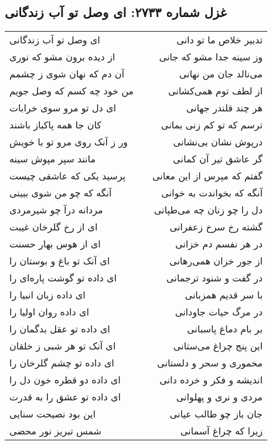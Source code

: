 \begin{center}
\section*{غزل شماره ۲۷۳۳: ای وصل تو آب زندگانی}
\label{sec:2733}
\begin{longtable}{l p{0.5cm} r}
ای وصل تو آب زندگانی
&&
تدبیر خلاص ما تو دانی
\\
از دیده برون مشو که نوری
&&
وز سینه جدا مشو که جانی
\\
آن دم که نهان شوی ز چشمم
&&
می‌نالد جان من نهانی
\\
من خود چه کسم که وصل جویم
&&
از لطف توم همی‌کشانی
\\
ای دل تو مرو سوی خرابات
&&
هر چند قلندر جهانی
\\
کان جا همه پاکباز باشند
&&
ترسم که تو کم زنی بمانی
\\
ور ز آنک روی مرو تو با خویش
&&
درپوش نشان بی‌نشانی
\\
مانند سپر مپوش سینه
&&
گر عاشق تیر آن کمانی
\\
پرسید یکی که عاشقی چیست
&&
گفتم که مپرس از این معانی
\\
آنگه که چو من شوی ببینی
&&
آنگه که بخواندت به خوانی
\\
مردانه درآ چو شیرمردی
&&
دل را چو زنان چه می‌طپانی
\\
ای از رخ گلرخان غیبت
&&
گشته رخ سرخ زعفرانی
\\
ای از هوس بهار حسنت
&&
در هر نفسم دم خزانی
\\
ای آنک تو باغ و بوستان را
&&
از جور خزان همی‌رهانی
\\
ای داده تو گوشت پاره‌ای را
&&
در گفت و شنود ترجمانی
\\
ای داده زبان انبیا را
&&
با سر قدیم همزبانی
\\
ای داده روان اولیا را
&&
در مرگ حیات جاودانی
\\
ای داده تو عقل بدگمان را
&&
بر بام دماغ پاسبانی
\\
ای آنک تو هر شبی ز خلقان
&&
این پنج چراغ می‌ستانی
\\
ای داده تو چشم گلرخان را
&&
مخموری و سحر و دلستانی
\\
ای داده دو قطره خون دل را
&&
اندیشه و فکر و خرده دانی
\\
ای داده تو عشق را به قدرت
&&
مردی و نری و پهلوانی
\\
این بود نصیحت سنایی
&&
جان باز چو طالب عیانی
\\
شمس تبریز نور محضی
&&
زیرا که چراغ آسمانی
\\
\end{longtable}
\end{center}
